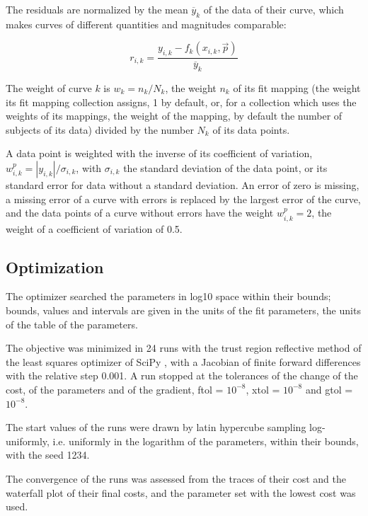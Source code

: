 \documentclass{article}
\begin{document}
The residuals are normalized by the mean $\overline{y}_k$ of the data of their curve, which makes curves of different quantities and magnitudes comparable:

\begin{equation}
r_{i,k} = \frac{y_{i,k} - f_k(x_{i,k}, \vec{p})}{\overline{y}_k}
\end{equation}

The weight of curve $k$ is $w_k = n_k / N_k$, the weight $n_k$ of its fit mapping (the weight its fit mapping collection assigns, 1 by default, or, for a collection which uses the weights of its mappings, the weight of the mapping, by default the number of subjects of its data) divided by the number $N_k$ of its data points.

A data point is weighted with the inverse of its coefficient of variation, $w^{p}_{i,k} = |y_{i,k}| / \sigma_{i,k}$, with $\sigma_{i,k}$ the standard deviation of the data point, or its standard error for data without a standard deviation. An error of zero is missing, a missing error of a curve with errors is replaced by the largest error of the curve, and the data points of a curve without errors have the weight $w^{p}_{i,k} = 2$, the weight of a coefficient of variation of 0.5.

\subsection{Optimization}

The optimizer searched the parameters in log10 space within their bounds; bounds, values and intervals are given in the units of the fit parameters, the units of the table of the parameters.

The objective was minimized in 24 runs with the trust region reflective method \cite{Branch1999} of the least squares optimizer of SciPy \cite{Virtanen2020}, with a Jacobian of finite forward differences with the relative step 0.001. A run stopped at the tolerances of the change of the cost, of the parameters and of the gradient, ftol = $10^{-8}$, xtol = $10^{-8}$ and gtol = $10^{-8}$.

The start values of the runs were drawn by latin hypercube sampling \cite{McKay1979} log-uniformly, i.e. uniformly in the logarithm of the parameters, within their bounds, with the seed 1234.

The convergence of the runs was assessed from the traces of their cost and the waterfall plot of their final costs, and the parameter set with the lowest cost was used.
\end{document}
